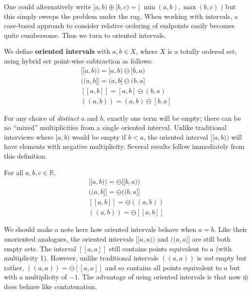 One could alternatively write $[a,b)\oplus [b,c) = [\; \min(a,b),\max(b,c) \;)$ but this simply sweeps the problem 
under the rug.
When working with intervals, a case-based approach to consider relative ordering of endpoints easily becomes quite cumbersome.
Thus we turn to oriented intervals.


\begin{definition}
	We define \textbf{oriented intervals} with $a,b\in X$, where $X$ is a totally ordered set, 
	using hybrid set point-wise subtraction as follows:
	\begin{equation}
		\begin{array}{cc}
			{[\![ a,b )\!)} = [a,b) \ominus [b,a) \\
			{(\!( a,b ]\!]} = (a,b] \ominus (b,a] \\
			{[\![ a,b ]\!]} = [a,b] \ominus (b,a) \\
			{(\!( a,b )\!)} = (a,b) \ominus [b,a]
		\end{array}
	\end{equation}
\end{definition}

For any choice of \emph{distinct} $a$ and $b$, exactly one term will be empty; there can be no ``mixed'' multiplicities from a single oriented interval.
Unlike traditional interviews where $[a,b)$ would be empty if $b < a$,  
the oriented interval $[\![a,b)\!)$ will have elements with negative multiplicity.
Several results follow immediately from this definition.

\begin{theorem} For all $a,b,c \in \mathbb{R}$, 
	\begin{equation}
		\begin{array}{cc}
		{[\![a,b)\!)} = \ominus [\![b,a)\!) \\
		{(\!(a,b]\!]} = \ominus (\!(b,a]\!] \\
		{[\![a,b]\!]} = \ominus (\!(a,b)\!) \\
		{(\!(a,b)\!)} = \ominus [\![a,b]\!]
		\end{array}
	\end{equation}
\end{theorem}

We should make a note here how oriented intervals behave when $a=b$.
Like their unoriented analogues, the oriented intervals $[\![ a,a )\!)$ and $(\!( a,a ]\!]$ are still both empty sets.
The interval $[\![a,a]\!]$ still contains points equivalent to $a$ (with multiplicity 1).
However, unlike traditional intervals $(\!(a,a)\!)$ is \emph{not} empty but rather, $(\!(a,a)\!) = \ominus [\![a,a]\!]$ and so contains all points equivalent to $a$ but with a multiplicity of $-1$.
The advantage of using oriented intervals is that now $\oplus$ does behave like contatenation.

